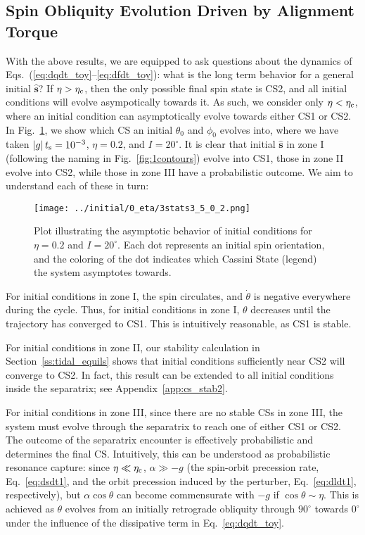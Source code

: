 \documentclass[
        fleqn,
        usenatbib,
    ]{mnras}
\newcommand*{\abs}[1]{\left|#1\right|}
\newcommand*{\uv}[1]{\hat{\mathbf{#1}}}
\begin{document}
\subsection{Spin Obliquity Evolution Driven by Alignment
Torque}\label{ss:toy_outcomes}

With the above results, we are equipped to ask questions about the dynamics of
Eqs.~(\ref{eq:dqdt_toy}--\ref{eq:dfdt_toy}): what is the long term behavior for
a general initial $\uv{s}$? If $\eta > \eta_{\rm c}$, then the only possible
final spin state is CS2, and all initial conditions will evolve asympotically
towards it. As such, we consider only $\eta < \eta_{\rm c}$, where an initial
condition can asymptotically evolve towards either CS1 or CS2. In
Fig.~\ref{fig:toy_phop}, we show which CS an initial $\theta_0$ and $\phi_0$
evolves into, where we have taken $\abs{g}t_{\rm s} = 10^{-3}$, $\eta = 0.2$,
and $I = 20^\circ$. It is clear that initial $\uv{s}$ in zone I (following the
naming in Fig.~\ref{fig:1contours}) evolve into CS1, those in zone II evolve
into CS2, while those in zone III have a probabilistic outcome. We aim to
understand each of these in turn:
\begin{figure}
    \centering
    \texttt{[image: ../initial/0\_eta/3stats3\_5\_0\_2.png]}
    \caption{Plot illustrating the asymptotic behavior of initial conditions for
    $\eta = 0.2$ and $I = 20^\circ$. Each dot represents an initial spin
    orientation, and the coloring of the dot indicates which Cassini State
    (legend) the system asymptotes towards.}\label{fig:toy_phop}
\end{figure}

For initial conditions in zone I, the spin circulates, and $\dot{\theta}$ is
negative everywhere during the cycle. Thus, for initial conditions in zone I,
$\theta$ decreases until the trajectory has converged to CS1. This is
intuitively reasonable, as CS1 is stable.

For initial conditions in zone II, our stability calculation in
Section~\ref{ss:tidal_equils} shows that initial conditions sufficiently near CS2
will converge to CS2. In fact, this result can be extended to all initial
conditions inside the separatrix; see Appendix~\ref{app:cs_stab2}.

For initial conditions in zone III, since there are no stable CSs in zone III,
the system must evolve through the separatrix to reach one of either CS1 or CS2.
The outcome of the separatrix encounter is effectively probabilistic and
determines the final CS\@. Intuitively, this can be understood as probabilistic
resonance capture: since $\eta \ll \eta_{\rm c}$, $\alpha \gg -g$ (the
spin-orbit precession rate, Eq.~\ref{eq:dsdt1}, and the orbit precession induced
by the perturber, Eq.~\ref{eq:dldt1}, respectively), but $\alpha \cos \theta$
can become commensurate with $-g$ if $\cos \theta \sim \eta$. This is achieved
as $\theta$ evolves from an initially retrograde obliquity through $90^\circ$
towards $0^\circ$ under the influence of the dissipative term in
Eq.~\eqref{eq:dqdt_toy}.
\end{document}
